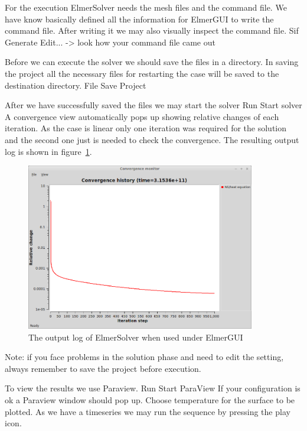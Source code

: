 For the execution 
ElmerSolver needs the mesh files and the command file. We have know basically defined
all the information for ElmerGUI to write the command file. After writing it we may also visually 
inspect the command file.
\ttbegin
Sif
  Generate
  Edit... -> look how your command file came out  
\ttend

Before we can execute the solver we should save the files in a directory. In saving the project all the
necessary files for restarting the case will be saved to the 
destination directory.
\ttbegin
File 
  Save Project
\ttend

After we have successfully saved the files we may start the solver
\ttbegin
Run
  Start solver
\ttend
A convergence view automatically pops up showing relative changes of each iteration.
As the case is linear only one iteration was required for the solution and the second one
just is needed to check the convergence. 
The resulting output log is shown in figure~\ref{fg:GeoSlabConv}.

\begin{figure}
\begin{center}
\includegraphics[width=100mm]{GeoSlabConvergence}
\caption{The output log of ElmerSolver when used under ElmerGUI}\label{fg:GeoSlabConv}
\end{center}
\end{figure}

Note: if you face problems in the solution phase and need to edit the setting, always remember to save
the project before execution.

To view the results we use Paraview.
\ttbegin
Run
  Start ParaView
\ttend
If your configuration is ok a Paraview window should pop up.
Choose temperature for the surface to be plotted. 
As we have a timeseries we may run the sequence by pressing the play icon. 

